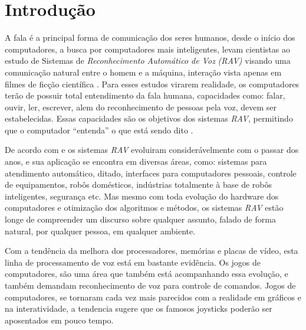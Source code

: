 \chapter{Introdução}

A fala é a principal forma de comunicação dos seres humanos, desde o início dos computadores, a busca por computadores mais inteligentes, levam cientistas ao estudo de Sistemas de \textit {Reconhecimento Automático de Voz} \textit {(RAV)} visando uma comunicação natural entre o homem e a máquina, interação vista apenas em filmes de ficção científica \cite{RavPtBrCarlos}.
Para esses estudos virarem realidade, os computadores terão de possuir total entendimento da fala humana, capacidades como: falar, ouvir, ler, escrever, alem do reconhecimento de pessoas pela voz, devem ser estabelecidas. Essas capacidades são os objetivos dos sistemas \textit{RAV}, permitindo que o computador “entenda” o que está sendo dito \cite{RavCorporaCarlos}.

De acordo com  e  os sistemas \textit{RAV} evoluiram considerávelmente com o passar dos anos, e sua aplicação se encontra em diversas áreas, como: sistemas para atendimento automático, ditado, interfaces para computadores pessoais, controle de equipamentos, robôs domésticos, indústrias totalmente à base de robôs inteligentes, segurança etc. Mas mesmo com toda evolução do hardware dos computadores e otimização dos algoritmos e métodos, os sistemas \textit{RAV} estão longe de compreender um discurso sobre qualquer assunto, falado de forma natural, por qualquer pessoa, em qualquer ambiente. 

Com a tendência da melhora dos processadores, memórias e placas de vídeo, esta linha de processamento de voz está em bastante evidência. Os jogos de computadores, são uma área que também está acompanhando essa evolução, e também demandam reconhecimento de voz para controle de comandos. Jogos de computadores, se tornaram cada vez mais parecidos com a realidade em gráficos e na interatividade, a tendencia sugere que os famosos joysticks poderão ser aposentados em pouco tempo.

